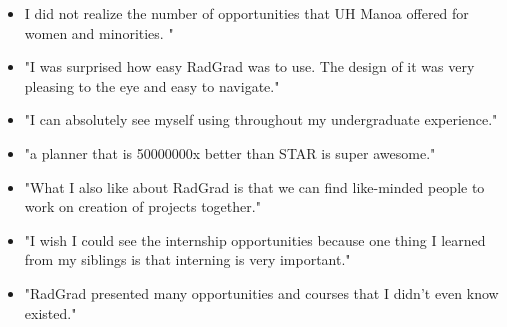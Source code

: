 \documentclass[acmsmall]{acmart}
\begin{document}
\begin{itemize}
\item I did not realize the number of opportunities that UH Manoa offered for women and minorities. "
\end{itemize}

\begin{itemize}
\item "I was surprised how easy RadGrad was to use. The design of it was very pleasing to the eye and easy to navigate."
\end{itemize}

\begin{itemize}
\item "I can absolutely see myself using throughout my undergraduate experience."
\end{itemize}

\begin{itemize}
\item "a planner that is 50000000x better than STAR is super awesome."
\end{itemize}

\begin{itemize}
\item "What I also like about RadGrad is that we can find like-minded people to work on creation of projects together."
\end{itemize}

\begin{itemize}
\item "I wish I could see the internship opportunities because one thing I learned from my siblings is that interning is very important."
\end{itemize}

\begin{itemize}
\item "RadGrad presented many opportunities and courses that I didn't even know existed."
\end{itemize}







\end{document}
